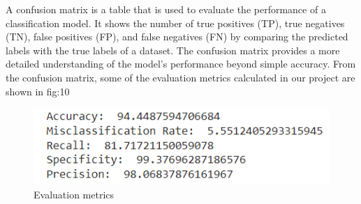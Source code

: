 \documentclass[conference]{IEEEtran}
\begin{document}
\par A confusion matrix is a table that is used to evaluate the performance of a classification model. It shows the number of true positives (TP), true negatives (TN), false positives (FP), and false negatives (FN) by comparing the predicted labels with the true labels of a dataset. The confusion matrix provides a more detailed understanding of the model's performance beyond simple accuracy. From the confusion matrix, some of the evaluation metrics calculated in our project are shown in fig:10
\begin{figure}[H]
\centerline{\includegraphics[scale=0.75]{CMvalues.png}}
\caption{Evaluation metrics}
\label{fig}
\end{figure}
\end{document}
